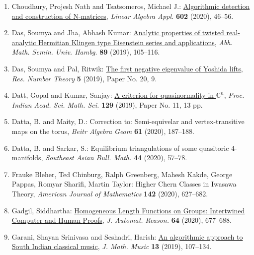 \begin{enumerate}[resume, leftmargin=27pt]
	\item Choudhury, Projesh Nath and Tsatsomeros, Michael J.: \href{https://doi.org/10.1016/j.laa.2020.04.028}{Algorithmic detection and construction of {N}-matrices}, \emph{Linear Algebra Appl.} {\bf 602} (2020), 46--56.

	\item Das, Soumya and Jha, Abhash Kumar: \href{https://doi.org/10.1007/s12188-019-00206-7}{Analytic properties of twisted real-analytic {H}ermitian
	      {K}lingen type {E}isenstein series and applications}, \emph{Abh. Math. Semin. Univ. Hambg.} {\bf 89} (2019), 105--116.

	\item Das, Soumya and Pal, Ritwik: \href{https://doi.org/10.1007/s40993-019-0158-x}{The first negative eigenvalue of {Y}oshida lifts}, \emph{Res. Number Theory} {\bf 5} (2019), Paper No. 20, 9.


	\item Datt, Gopal and Kumar, Sanjay: \href{https://link.springer.com/article/10.1007/s12044-018-0449-5?shared-article-renderer}{A criterion for quasinormality in $\mathbb{C}^n$}, \emph{Proc. Indian Acad. Sci. Math. Sci.} {\bf 129} (2019), Paper No. 11, 13 pp.

	\item Datta, B. and Maity, D.: Correction to: Semi-equivelar and vertex-transitive maps on the torus, \emph{Beitr Algebra Geom} {\bf 61} (2020), 187--188.

	\item Datta, B. and Sarkar, S.: Equilibrium triangulations of some quasitoric 4-manifolds, \emph{Southeast Asian Bull. Math.} {\bf 44} (2020), 57--78.

	\item Frauke Bleher, Ted Chinburg, Ralph Greenberg, Mahesh Kakde, George Pappas, Romyar Sharifi, Martin Taylor: Higher Chern Classes in Iwasawa Theory, \emph{American Journal of Mathematics} {\bf 142} (2020), 627--682.

	\item Gadgil, Siddhartha: \href{https://doi.org/10.1007/s10817-019-09523-1}{Homogeneous {L}ength {F}unctions on {G}roups: {I}ntertwined
	      {C}omputer and {H}uman {P}roofs}, \emph{J. Automat. Reason.} {\bf 64} (2020), 677--688.

	\item Garani, Shayan Srinivasa and Seshadri, Harish: \href{https://doi.org/10.1080/17459737.2019.1604845}{An algorithmic approach to {S}outh {I}ndian classical music}, \emph{J. Math. Music} {\bf 13} (2019), 107--134.


\end{enumerate}
